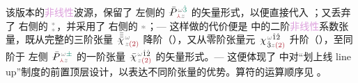 该版本的\textcolor{Plum}{非线性}\textcolor{NavyBlue}{波源}，保留了  左侧的 $\xint{\mathcolor{gray}{-}}{25}{\bar{P}}^{\;\! \mathcolor{gray}{\omega} \textcolor{PineGreen}{\hat{3}}}_{\;\! \textcolor{Maroon}{\Yup} \mathcolor{gray}{z}}$ 的矢量形式，以便直接代入 ；又丢弃了  右侧的 ${}^{\mathcolor{gray}{*}}_{\mathcolor{gray}{*}}$，并采用了  右侧的 $\mathcolor{gray}{*}$；--- 这样做的代价便是  中的二阶\textcolor{Plum}{非线性}系数张量，既从完整的三阶张量 $\xint{{}^{}_{\mathcolor{gray}{-}}}{23}{\bar{\bar{\bar{\chi}}}}^{\;\! \mathcolor{gray}{\omega} }_{\;\! \mathcolor{gray}{z} \textcolor{Maroon}{(2)} }$ 降阶（），又从零阶张量元 $\xint{{}^{}_{\mathcolor{gray}{-}}}{23}{\chi}^{\;\! \mathcolor{gray}{\omega} \hat{1} \hat{2} }_{\;\! \hat{3} \mathcolor{gray}{z} \textcolor{Maroon}{(2)} }$ 升阶（），至同阶于  左侧 $\xint{\mathcolor{gray}{-}}{25}{\bar{P}}^{\;\! \mathcolor{gray}{\omega} \textcolor{PineGreen}{\pm}}_{\;\! \textcolor{Maroon}{\Yup} \mathcolor{gray}{z}}$ 的一阶张量 $\xint{{}^{}_{\mathcolor{gray}{-}}}{23}{\bar{\chi}}^{\;\! \mathcolor{gray}{\omega} \hat{1} \hat{2} }_{\;\! \mathcolor{gray}{z} \textcolor{Maroon}{(2)} }$ 的矢量形式。--- 这便体现了  中对“划上线 line up”制度的前置顶层设计，以表达不同阶张量的优势。算符的运算顺序见 。

